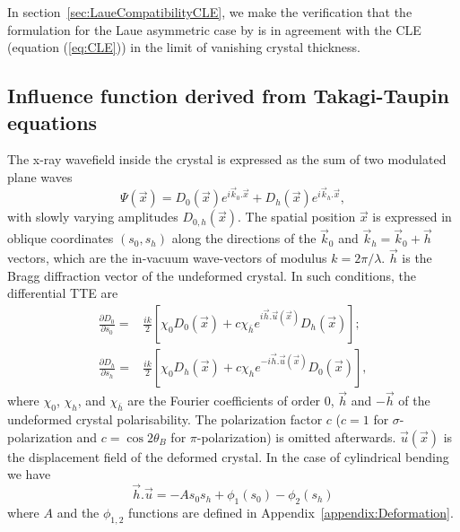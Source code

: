 \documentclass[preprint]{iucr}              %
\newcommand{\inred}[1]{{\color{red}#1}}
\begin{document}
In section~\ref{sec:LaueCompatibilityCLE}, we make the verification that the formulation for the Laue asymmetric case by
\cite{GuigayFerrero2016} is in agreement with the CLE (equation (\ref{eq:CLE})) in the limit of vanishing crystal thickness.

\subsection{Influence function derived from Takagi-Taupin equations}
\label{sec:influence}

The x-ray wavefield inside the crystal is expressed as the sum of two modulated plane waves
\begin{equation}
    \Psi(\vec x) = D_0(\vec x) e^{i \vec k_0 . \vec x} + D_h(\vec x) e^{i \vec k_h . \vec x},
\end{equation}
with slowly varying amplitudes $D_{0,h}(\vec x)$.
The spatial position $\vec x$ is expressed in oblique coordinates $(s_0,s_h)$ along the directions of the $\vec k_0$ and $\vec k_h=\vec k_0 + \vec h$ vectors, which are the in-vacuum wave-vectors \inred{of} modulus $k=2\pi/\lambda$. $\vec{h}$ is the Bragg diffraction vector of the undeformed crystal. In such conditions, the differential TTE are
\begin{subequations}
\label{eq:TT}
\begin{align}
\frac{\partial D_0}{\partial s_0} =& \frac{ik}{2} \left[ \chi_0 D_0(\vec x)+c \chi_{\bar h} e^{i \vec h . \vec u (\vec x)} D_h(\vec x) \right]; \\
\frac{\partial D_h}{\partial s_h} =& \frac{ik}{2} \left[ \chi_0 D_h(\vec x)+c \chi_{h} e^{-i \vec h . \vec u (\vec x)} D_0(\vec x) \right],
\end{align}
\end{subequations}
where $\chi_0$, $\chi_h$, and $\chi_{\bar h}$ are the Fourier coefficients of order 0, $\vec h$ and $-\vec h$ of the undeformed crystal polarisability. The polarization factor $c$ ($c=1$ for $\sigma$-polarization and $c=\cos2\theta_B$  for $\pi$-polarization) is omitted afterwards. 
$\vec u (\vec x)$ is the displacement field of the deformed crystal.
In the case of cylindrical bending we have
\begin{equation}
\label{eq:cylinder}
    \vec h . \vec u = -A s_0 s_h + \phi_1(s_0) - \phi_2(s_h)
\end{equation}
where $A$ and the $\phi_{1,2}$ functions are defined in Appendix~\ref{appendix:Deformation}.
\end{document}
